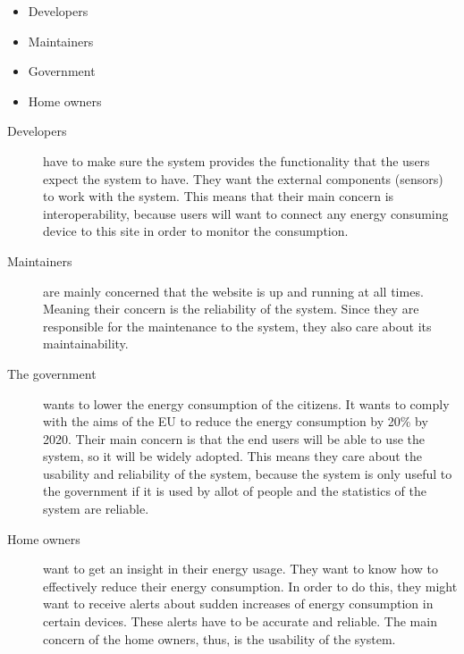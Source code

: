 \begin{itemize}
\item Developers
\item Maintainers
\item Government
\item Home owners
\end{itemize}

\begin{description}


\item [Developers] have to make sure the system provides the functionality that the users expect the system to have. They want the external components (sensors) to work with the system. This means that their main concern is interoperability, because users will want to connect any energy consuming device to this site in order to monitor the consumption.

\item [Maintainers] are mainly concerned that the website is up and running at all times. Meaning their concern is the reliability of the system. Since they are responsible for the maintenance to the system, they also care about its maintainability.

\item [The government] wants to lower the energy consumption of the citizens. It wants to comply with the aims of the EU to reduce the energy consumption by 20\% by 2020. Their main concern is that the end users will be able to use the system, so it will be widely adopted. This means they care about the usability and reliability of the system, because the system is only useful to the government if it is used by allot of people and the statistics of the system are reliable.

\item [Home owners] want to get an insight in their energy usage. They want to know how to effectively reduce their energy consumption. In order to do this, they might want to receive alerts about sudden increases of energy consumption in certain devices. These alerts have to be accurate and reliable. The main concern of the home owners, thus, is the usability of the system.

\end{description}


